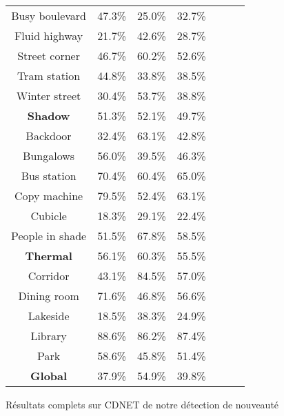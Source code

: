 \begin{tableth}
\begin{tabular}{|c|c|c|c|c|c|c|}
		Busy boulevard & 47.3\% & 25.0\% & 32.7\% & & &\\
		Fluid highway & 21.7\% & 42.6\% & 28.7\% & & &\\
		Street corner & 46.7\% & 60.2\% & 52.6\% & & &\\
		Tram station & 44.8\% & 33.8\% & 38.5\% & & &\\
		Winter street & 30.4\% & 53.7\% & 38.8\% & & &\\
		\hline
        \textbf{Shadow} & 51.3\% & 52.1\% & 49.7\% & & &\\
		\hline
		Backdoor & 32.4\% & 63.1\% & 42.8\% & & &\\
		Bungalows & 56.0\% & 39.5\% & 46.3\% & & &\\
		Bus station & 70.4\% & 60.4\% & 65.0\% & & &\\
		Copy machine & 79.5\% & 52.4\% & 63.1\% & & &\\
		Cubicle & 18.3\% & 29.1\% & 22.4\% & & &\\
		People in shade & 51.5\% & 67.8\% & 58.5\% & & &\\
		\hline
        \textbf{Thermal} & 56.1\% & 60.3\% & 55.5\% & & &\\
		\hline
		Corridor & 43.1\% & 84.5\% & 57.0\% & & &\\
		Dining room & 71.6\% & 46.8\% & 56.6\% & & &\\
		Lakeside & 18.5\% & 38.3\% & 24.9\% & & &\\
		Library & 88.6\% & 86.2\% & 87.4\% & & &\\
		Park & 58.6\% & 45.8\% & 51.4\% & & &\\
		\hline
        \textbf{Global} & 37.9\% & 54.9\% & 39.8\% & & & \\
    	\hline
	\end{tabular}
	\caption{Résultats complets sur CDNET de notre détection de nouveauté}
	\label{tab:res:complet1}
	\end{tableth}


